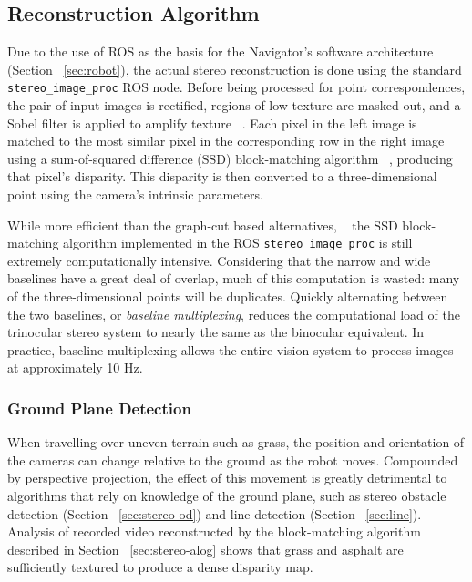 \documentclass[twocolumn,11pt]{article}
\begin{document}
\subsection{Reconstruction Algorithm}
\label{sec:stereo-algo}
Due to the use of ROS as the basis for the Navigator's software architecture
(Section ~\ref{sec:robot}), the actual stereo reconstruction is done using the
standard \texttt{stereo\_image\_proc} ROS node. Before being processed for
point correspondences, the pair of input images is rectified, regions of low
texture are masked out, and a Sobel filter is applied to amplify texture
~\cite{stereo}. Each pixel in the left image is matched to the most similar
pixel in the corresponding row in the right image using a sum-of-squared
difference (SSD) block-matching algorithm ~\cite{stereo}, producing that
pixel's disparity. This disparity is then converted to a three-dimensional point
using the camera's intrinsic parameters.

While more efficient than the graph-cut based alternatives, ~\cite{stereo} the
SSD block-matching algorithm implemented in the ROS
\texttt{stereo\_image\_proc} is still extremely computationally intensive.
Considering that the narrow and wide baselines have a great deal of overlap,
much of this computation is wasted: many of the three-dimensional points will
be duplicates. Quickly alternating between the two baselines, or
\textit{baseline multiplexing}, reduces the computational load of the
trinocular stereo system to nearly the same as the binocular equivalent. In
practice, baseline multiplexing allows the entire vision system to process
images at approximately 10 Hz.

\subsubsection{Ground Plane Detection}
\label{sec:stereo-ground}
When travelling over uneven terrain such as grass, the position and orientation
of the cameras can change relative to the ground as the robot moves. Compounded
by perspective projection, the effect of this movement is greatly detrimental
to algorithms that rely on knowledge of the ground plane, such as stereo
obstacle detection (Section ~\ref{sec:stereo-od}) and line detection (Section
~\ref{sec:line}). Analysis of recorded video reconstructed by the
block-matching algorithm described in Section ~\ref{sec:stereo-alog} shows that
grass and asphalt are sufficiently textured to produce a dense disparity map.
\end{document}
